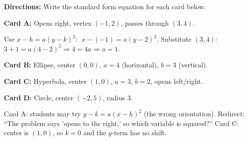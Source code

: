 \documentclass[10pt]{article}
\begin{document}
\begin{tcolorbox}[colback=white, colframe=black!40,
    title=\textbf{Tier A --- Approaching Proficiency},
    fonttitle=\bfseries, arc=2mm, left=3mm, right=3mm, top=2mm, bottom=2mm]

\textbf{Directions:} Write the standard form equation for each card below.

\vspace{6pt}
\textbf{Card A:} Opens right, vertex $(-1, 2)$, passes through $(3, 4)$.

Use $x - h = a(y - k)^2$: $\;x - (-1) = a(y - 2)^2$.
Substitute $(3, 4)$: $3 + 1 = a(4-2)^2 \Rightarrow 4 = 4a \Rightarrow a = 1$.


\vspace{8pt}
\textbf{Card B:} Ellipse, center $(0,0)$, $a = 4$ (horizontal), $b = 3$ (vertical).


\vspace{8pt}
\textbf{Card C:} Hyperbola, center $(1,0)$, $a = 3$, $b = 2$, opens left/right.


\vspace{8pt}
\textbf{Card D:} Circle, center $(-2,5)$, radius $3$.


\end{tcolorbox}

\begin{teachernote}
Card A: students may try $y - k = a(x-h)^2$ (the wrong orientation). Redirect:
``The problem says 'opens to the right,' so which variable is squared?''
Card C: center is $(1, 0)$, so $k = 0$ and the $y$-term has no shift.
\end{teachernote}

\vspace{0.10in}
\end{document}
